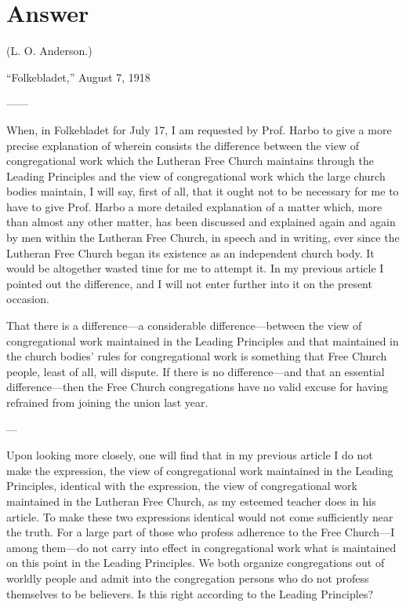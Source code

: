 



\section{Answer}

(L. O. Anderson.)

“Folkebladet,” August 7, 1918


——

When, in Folkebladet for July 17, I am requested by Prof. Harbo to give a more precise explanation of wherein consists the difference between the view of congregational work which the Lutheran Free Church maintains through the Leading Principles and the view of congregational work which the large church bodies maintain, I will say, first of all, that it ought not to be necessary for me to have to give Prof. Harbo a more detailed explanation of a matter which, more than almost any other matter, has been discussed and explained again and again by men within the Lutheran Free Church, in speech and in writing, ever since the Lutheran Free Church began its existence as an independent church body. It would be altogether wasted time for me to attempt it. In my previous article I pointed out the difference, and I will not enter further into it on the present occasion.

That there is a difference—a considerable difference—between the view of congregational work maintained in the Leading Principles and that maintained in the church bodies’ rules for congregational work is something that Free Church people, least of all, will dispute. If there is no difference—and that an essential difference—then the Free Church congregations have no valid excuse for having refrained from joining the union last year.

---

Upon looking more closely, one will find that in my previous article I do not make the expression, the view of congregational work maintained in the Leading Principles, identical with the expression, the view of congregational work maintained in the Lutheran Free Church, as my esteemed teacher does in his article. To make these two expressions identical would not come sufficiently near the truth. For a large part of those who profess adherence to the Free Church—I among them—do not carry into effect in congregational work what is maintained on this point in the Leading Principles. We both organize congregations out of worldly people and admit into the congregation persons who do not profess themselves to be believers. Is this right according to the Leading Principles?


